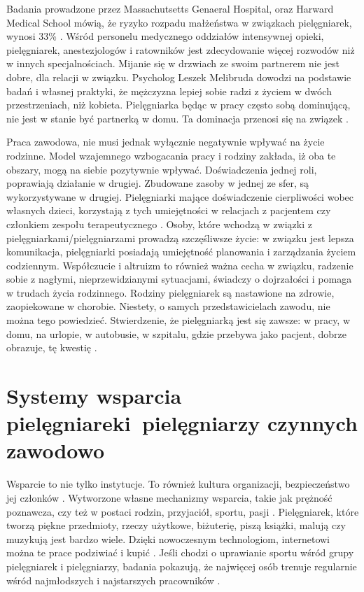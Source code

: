 \documentclass[a4paper,12pt,twoside,openany]{report}
\begin{document}
Badania prowadzone przez Massachutsetts Genaeral Hospital, oraz Harward Medical School mówią, że ryzyko rozpadu małżeństwa w związkach pielęgniarek, wynosi 33\% \cite{rozwody}.  Wśród personelu medycznego oddziałów intensywnej opieki, pielęgniarek, anestezjologów i ratowników jest zdecydowanie więcej rozwodów niż w innych specjalnościach. Mijanie się w drzwiach ze swoim partnerem nie jest dobre, dla relacji w związku. Psycholog Leszek Melibruda dowodzi na podstawie badań i własnej praktyki, że mężczyzna lepiej sobie radzi z życiem w dwóch przestrzeniach, niż kobieta. Pielęgniarka będąc w pracy często sobą dominującą, nie jest w stanie być partnerką w domu. Ta dominacja przenosi się na związek \cite{melibruda}.

Praca zawodowa, nie musi jednak wyłącznie negatywnie wpływać na życie rodzinne. Model wzajemnego wzbogacania pracy i rodziny zakłada, iż oba te obszary, mogą na siebie pozytywnie wpływać. Doświadczenia jednej roli, poprawiają działanie w drugiej. Zbudowane zasoby w jednej ze sfer, są wykorzystywane w drugiej. Pielęgniarki mające doświadczenie cierpliwości wobec własnych dzieci, korzystają z tych umiejętności w relacjach z pacjentem czy członkiem zespołu terapeutycznego \cite{wzbogacanie}. Osoby, które wchodzą w związki z pielęgniarkami/pielęgniarzami prowadzą szczęśliwsze życie: w związku jest lepsza komunikacja, pielęgniarki posiadają umiejętność planowania i zarządzania życiem codziennym. Współczucie i altruizm to również ważna cecha w związku, radzenie sobie z nagłymi, nieprzewidzianymi sytuacjami, świadczy o dojrzałości i pomaga w trudach życia rodzinnego. Rodziny pielęgniarek są nastawione na zdrowie, zaopiekowane w chorobie. Niestety, o samych przedstawicielach zawodu, nie można tego powiedzieć. Stwierdzenie, że pielęgniarką jest się zawsze: w pracy, w domu, na urlopie, w autobusie, w szpitalu, gdzie przebywa jako pacjent, dobrze obrazuje, tę kwestię \cite{zdrowie}.



\section{Systemy wsparcia pielęgniarek\newline i~pielęgniarzy czynnych zawodowo}
\label{sectionSystemyWsparcia}
Wsparcie to nie tylko instytucje. To również kultura organizacji, bezpieczeństwo jej członków \cite{bezpieczeństwo}. Wytworzone własne mechanizmy wsparcia, takie jak  prężność poznawcza, czy też w postaci  rodzin, przyjaciół, sportu, pasji \cite{prężność}. Pielęgniarek, które tworzą piękne przedmioty, rzeczy użytkowe, biżuterię, piszą książki, malują czy muzykują  jest bardzo wiele. Dzięki nowoczesnym technologiom, internetowi można te prace podziwiać i kupić \cite{talent}. Jeśli chodzi o uprawianie sportu wśród grupy pielęgniarek i pielęgniarzy, badania pokazują, że najwięcej osób trenuje regularnie wśród najmłodszych i najstarszych pracowników \cite{sport}.
\end{document}
